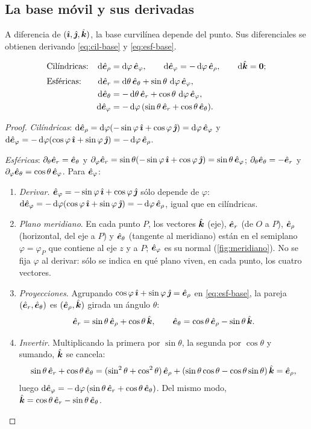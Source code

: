 \subsection{La base móvil y sus derivadas}

A diferencia de $(\hat{\bm{\imath}},\hat{\bm{\jmath}},\hat{\bm{k}})$, la base curvilínea depende del punto. Sus
diferenciales se obtienen derivando \eqref{eq:cil-base} y \eqref{eq:esf-base}.

\begin{proposicion}
\label{prop:dbase}
\begin{align}
  &\text{Cilíndricas:} &
  \dd\erho&=\dd\varphi\,\ef,\qquad \dd\ef=-\dd\varphi\,\erho,\qquad \dd\kk=\vb{0};
  \label{eq:dcil}\\[1mm]
  &\text{Esféricas:} &
  \dd\er&=\dd\theta\,\et+\sin\theta\,\dd\varphi\,\ef,\notag\\
  && \dd\et&=-\dd\theta\,\er+\cos\theta\,\dd\varphi\,\ef,\label{eq:desf}\\
  && \dd\ef&=-\dd\varphi\,(\sin\theta\,\er+\cos\theta\,\et).\notag
\end{align}
\end{proposicion}

\begin{proof}
\emph{Cilíndricas}: $\mathop{}\!\mathrm{d}\hat{\bm{e}}_{\rho}=\mathop{}\!\mathrm{d}\varphi(-\sin\varphi\,\hat{\bm{\imath}}+\cos\varphi\,\hat{\bm{\jmath}})=\mathop{}\!\mathrm{d}\varphi\,\hat{\bm{e}}_{\varphi}$
y $\mathop{}\!\mathrm{d}\hat{\bm{e}}_{\varphi}=-\mathop{}\!\mathrm{d}\varphi(\cos\varphi\,\hat{\bm{\imath}}+\sin\varphi\,\hat{\bm{\jmath}})=-\mathop{}\!\mathrm{d}\varphi\,\hat{\bm{e}}_{\rho}$.

\noindent\emph{Esféricas}: $\partial_{\theta}\hat{\bm{e}}_{r}=\hat{\bm{e}}_{\theta}$ y
$\partial_{\varphi}\hat{\bm{e}}_{r}=\sin\theta(-\sin\varphi\,\hat{\bm{\imath}}+\cos\varphi\,\hat{\bm{\jmath}})=\sin\theta\,\hat{\bm{e}}_{\varphi}$;
$\partial_{\theta}\hat{\bm{e}}_{\theta}=-\hat{\bm{e}}_{r}$ y $\partial_{\varphi}\hat{\bm{e}}_{\theta}=\cos\theta\,\hat{\bm{e}}_{\varphi}$. Para $\hat{\bm{e}}_{\varphi}$:
\begin{enumerate}
  \item \emph{Derivar}. $\hat{\bm{e}}_{\varphi}=-\sin\varphi\,\hat{\bm{\imath}}+\cos\varphi\,\hat{\bm{\jmath}}$ sólo depende de $\varphi$:
  $\mathop{}\!\mathrm{d}\hat{\bm{e}}_{\varphi}=-\mathop{}\!\mathrm{d}\varphi(\cos\varphi\,\hat{\bm{\imath}}+\sin\varphi\,\hat{\bm{\jmath}})=-\mathop{}\!\mathrm{d}\varphi\,\hat{\bm{e}}_{\rho}$, igual que en cilíndricas.
  \item \emph{Plano meridiano}. En cada punto $P$, los vectores $\hat{\bm{k}}$ (eje), $\hat{\bm{e}}_{r}$
  (de $O$ a $P$), $\hat{\bm{e}}_{\rho}$ (horizontal, del eje a $P$) y $\hat{\bm{e}}_{\theta}$ (tangente al
  meridiano) están en el semiplano $\varphi=\varphi_{P}$ que contiene al eje $z$
  y a $P$; $\hat{\bm{e}}_{\varphi}$ es su normal (\cref{fig:meridiano}). No se fija $\varphi$ al
  derivar: sólo se indica en qué plano viven, en cada punto, los cuatro vectores.
  \item \emph{Proyecciones}. Agrupando $\cos\varphi\,\hat{\bm{\imath}}+\sin\varphi\,\hat{\bm{\jmath}}=\hat{\bm{e}}_{\rho}$ en
  \eqref{eq:esf-base}, la pareja $(\hat{\bm{e}}_{r},\hat{\bm{e}}_{\theta})$ es $(\hat{\bm{e}}_{\rho},\hat{\bm{k}})$ girada un ángulo $\theta$:
  \[
    \hat{\bm{e}}_{r}=\sin\theta\,\hat{\bm{e}}_{\rho}+\cos\theta\,\hat{\bm{k}},\qquad
    \hat{\bm{e}}_{\theta}=\cos\theta\,\hat{\bm{e}}_{\rho}-\sin\theta\,\hat{\bm{k}} .
  \]
  \item \emph{Invertir}. Multiplicando la primera por $\sin\theta$, la segunda por
  $\cos\theta$ y sumando, $\hat{\bm{k}}$ se cancela:
  \[
    \sin\theta\,\hat{\bm{e}}_{r}+\cos\theta\,\hat{\bm{e}}_{\theta}
    =(\sin^{2}\theta+\cos^{2}\theta)\,\hat{\bm{e}}_{\rho}+(\sin\theta\cos\theta-\cos\theta\sin\theta)\,\hat{\bm{k}}=\hat{\bm{e}}_{\rho},
  \]
  luego $\mathop{}\!\mathrm{d}\hat{\bm{e}}_{\varphi}=-\mathop{}\!\mathrm{d}\varphi\,(\sin\theta\,\hat{\bm{e}}_{r}+\cos\theta\,\hat{\bm{e}}_{\theta})$. Del mismo modo,
  $\hat{\bm{k}}=\cos\theta\,\hat{\bm{e}}_{r}-\sin\theta\,\hat{\bm{e}}_{\theta}$.\qedhere
\end{enumerate}
\end{proof}

